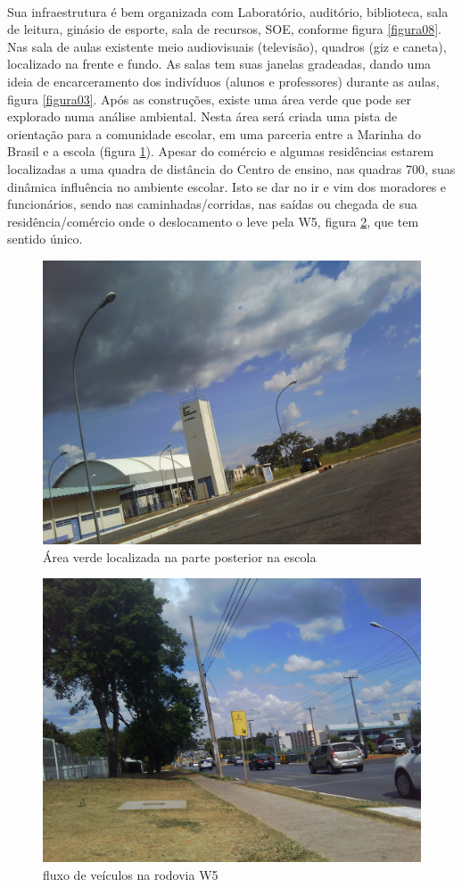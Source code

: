 \paragraph{}Sua  infraestrutura  é  bem  organizada  com Laboratório,   auditório,  biblioteca, sala de leitura,  ginásio  de  esporte, sala de recursos, SOE, conforme figura \ref{figura08}.  Nas  sala  de  aulas  existente  meio  audiovisuais (televisão), quadros  (giz  e  caneta),  localizado  na  frente  e  fundo. As salas tem suas janelas gradeadas, dando uma ideia de encarceramento dos indivíduos (alunos e professores) durante as aulas, figura \ref{figura03}. Após  as  construções,  existe uma área verde  que  pode  ser explorado numa análise ambiental. Nesta área será criada uma pista de orientação  para  a  comunidade  escolar,  em  uma parceria  entre  a  Marinha  do  Brasil  e   a escola  (figura \ref{figura04}).  Apesar  do  comércio  e  algumas  residências  estarem  localizadas  a  uma quadra  de  distância  do  Centro  de  ensino,  nas  quadras  700,  suas  dinâmica  influência  no ambiente  escolar.  Isto  se  dar  no  ir  e  vim  dos  moradores  e  funcionários,  sendo  nas caminhadas/corridas,  nas  saídas  ou  chegada  de  sua residência/comércio  onde o deslocamento o leve pela W5, figura \ref{figura05}, que tem sentido único.
\begin{figure}[!htpb]
        \centering
        \includegraphics[width=.5\textwidth]{imagens/2016-06-03T16-12-23.jpeg}
        \caption{Área verde localizada na parte posterior na escola}
        \label{figura04}
\end{figure}
\begin{figure}[!htpb]
        \centering
        \includegraphics[width=.5\textwidth]{imagens/2016-05-15T12-57-10.jpeg}
        \caption{fluxo de veículos na rodovia W5}
        \label{figura05}
\end{figure}
